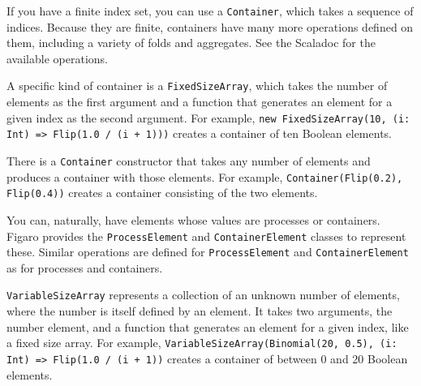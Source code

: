 If you have a finite index set, you can use a \texttt{Container}, which takes a sequence of indices. Because they are finite, containers have many more operations defined on them, including a variety of folds and aggregates. See the Scaladoc for the available operations. 

A specific kind of container is a \texttt{FixedSizeArray}, which takes the number of elements as the first argument and a function that generates an element for a given index as the second argument. For example, \texttt{new FixedSizeArray(10, (i: Int) => Flip(1.0 / (i + 1)))} creates a container of ten Boolean elements. 

There is a \texttt{Container} constructor that takes any number of elements and produces a container with those elements. For example, \texttt{Container(Flip(0.2), Flip(0.4))} creates a container consisting of the two elements.

You can, naturally, have elements whose values are processes or containers. Figaro provides the \texttt{ProcessElement} and \texttt{ContainerElement} classes to represent these. Similar operations are defined for \texttt{ProcessEl\-ement} and \texttt{ContainerElement} as for processes and containers.

\texttt{VariableSizeArray} represents a collection of an unknown number of elements, where the number is itself defined by an element. It takes two arguments, the number element, and a function that generates an element for a given index, like a fixed size array. For example, \texttt{VariableSizeArray(Binomial(20, 0.5), (i: Int) => Flip(1.0 / (i + 1))} creates a container of between 0 and 20 Boolean elements.

